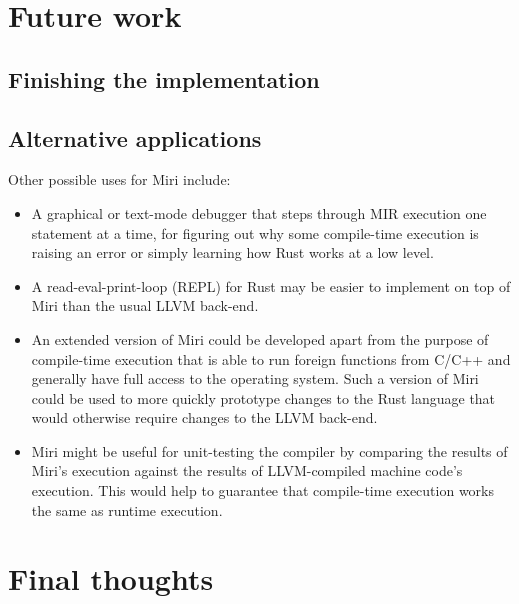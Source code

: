 \documentclass[twocolumn]{article}
\begin{document}

\section{Future work}

\subsection{Finishing the implementation}

\blindtext

\subsection{Alternative applications}

Other possible uses for Miri include:

\begin{itemize}
  \item A graphical or text-mode debugger that steps through MIR execution one statement at a time,
    for figuring out why some compile-time execution is raising an error or simply learning how Rust
    works at a low level.
  \item A read-eval-print-loop (REPL) for Rust may be easier to implement on top of Miri than the
    usual LLVM back-end.
  \item An extended version of Miri could be developed apart from the purpose of compile-time
    execution that is able to run foreign functions from C/C++ and generally have full access to the
    operating system. Such a version of Miri could be used to more quickly prototype changes to the
    Rust language that would otherwise require changes to the LLVM back-end.
  \item Miri might be useful for unit-testing the compiler by comparing the results of Miri's
    execution against the results of LLVM-compiled machine code's execution. This would help to
    guarantee that compile-time execution works the same as runtime execution.
\end{itemize}


\section{Final thoughts}
\end{document}
